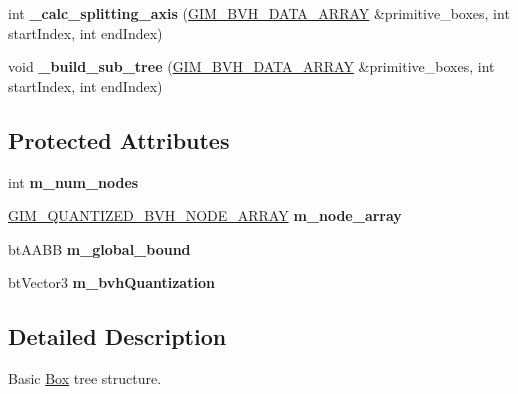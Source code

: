 \begin{DoxyCompactItemize}
\item 
\mbox{\label{classbtQuantizedBvhTree_ac6044782124c9990682482d51313cb24}} 
int {\bfseries \+\_\+calc\+\_\+splitting\+\_\+axis} (\hyperlink{classGIM__BVH__DATA__ARRAY}{G\+I\+M\+\_\+\+B\+V\+H\+\_\+\+D\+A\+T\+A\+\_\+\+A\+R\+R\+AY} \&primitive\+\_\+boxes, int start\+Index, int end\+Index)
\item 
\mbox{\label{classbtQuantizedBvhTree_a815e8aeaa478e42b1a34bc256a95a26d}} 
void {\bfseries \+\_\+build\+\_\+sub\+\_\+tree} (\hyperlink{classGIM__BVH__DATA__ARRAY}{G\+I\+M\+\_\+\+B\+V\+H\+\_\+\+D\+A\+T\+A\+\_\+\+A\+R\+R\+AY} \&primitive\+\_\+boxes, int start\+Index, int end\+Index)
\end{DoxyCompactItemize}
\subsection*{Protected Attributes}
\begin{DoxyCompactItemize}
\item 
\mbox{\label{classbtQuantizedBvhTree_aad1e915aabc1cd4a1bb683c876d52ae1}} 
int {\bfseries m\+\_\+num\+\_\+nodes}
\item 
\mbox{\label{classbtQuantizedBvhTree_ab555b35627f32f1f6fc0f8ad74640b4b}} 
\hyperlink{classGIM__QUANTIZED__BVH__NODE__ARRAY}{G\+I\+M\+\_\+\+Q\+U\+A\+N\+T\+I\+Z\+E\+D\+\_\+\+B\+V\+H\+\_\+\+N\+O\+D\+E\+\_\+\+A\+R\+R\+AY} {\bfseries m\+\_\+node\+\_\+array}
\item 
\mbox{\label{classbtQuantizedBvhTree_a3b3acd1e2ebeef8bae4e33574f9fe70b}} 
bt\+A\+A\+BB {\bfseries m\+\_\+global\+\_\+bound}
\item 
\mbox{\label{classbtQuantizedBvhTree_a26e5bdac35c86a50b5e4e94da2067a40}} 
bt\+Vector3 {\bfseries m\+\_\+bvh\+Quantization}
\end{DoxyCompactItemize}


\subsection{Detailed Description}
Basic \hyperlink{classBox}{Box} tree structure. 

